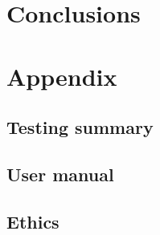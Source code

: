 \documentclass[12pt,a4paper]{report}
\begin{document}
\chapter{Conclusions}\label{chapter:concl}




\appendix
\chapter{Appendix}
\section{Testing summary}
\section{User manual}
\section{Ethics}

\end{document}
